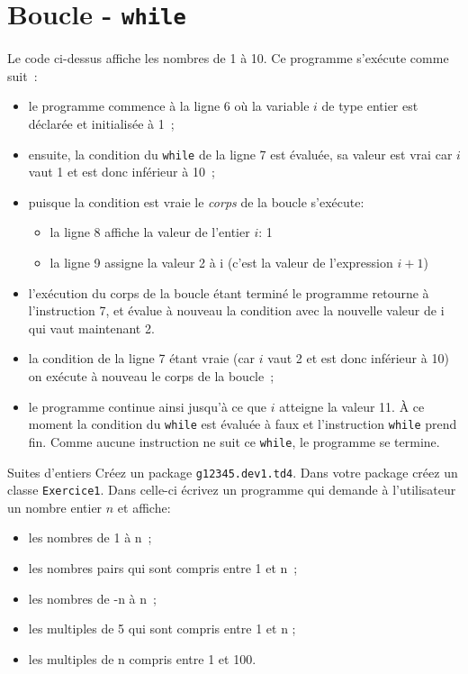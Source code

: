 \documentclass[a4paper,11pt]{style-esi/td}
\begin{document}

\section{Boucle - \texttt{while}}

	Le code ci-dessus affiche les nombres de 1 à 10.
	Ce programme s'exécute comme suit~:
	\begin{itemize}
		\item  le programme commence à la ligne 6 où la variable $i$ de type entier est déclarée et initialisée à 1~;
		\item  ensuite, la condition du \texttt{while} de la ligne 7 est évaluée, sa valeur est vrai car $i$ vaut 1 et est donc inférieur à 10~;
		\item puisque la condition est vraie le \emph{corps} de la boucle s'exécute:
			\begin{itemize}
				\item la ligne 8 affiche la valeur de l'entier $i$: 1
				\item la ligne 9 assigne la valeur 2 à i (c'est la valeur de l'expression $i+1$)
			\end{itemize}
		\item l'exécution du corps de la boucle étant terminé le programme retourne à l'instruction 7, 
			et évalue à nouveau la condition avec la nouvelle valeur de i qui vaut maintenant 2.
		\item  la condition de la ligne 7 étant vraie (car $i$ vaut 2 et est donc inférieur à 10) on exécute à nouveau le corps de la boucle~;
		\item le programme continue ainsi jusqu'à ce que $i$ atteigne la valeur 11. 
			\`A ce moment la condition du \texttt{while} est évaluée à faux et l'instruction 
			\texttt{while} prend fin.
			Comme aucune instruction ne suit ce \texttt{while}, le programme se termine.
	\end{itemize}

 
	\begin{Exercice}{Suites d'entiers}	
		Créez un package \texttt{g12345.dev1.td4}.
		Dans votre package créez un classe \texttt{Exercice1}.
		Dans celle-ci écrivez un programme qui demande à l'utilisateur un nombre entier $n$ et affiche:
		\begin{itemize}
			\item les nombres de 1 à n~;
			\item les nombres pairs qui sont compris entre 1 et n~;
			\item les nombres de -n à n~;
			\item les multiples de 5 qui sont compris entre 1 et n ;
			\item les multiples de n compris entre 1 et 100.
		\end{itemize}
	\end{Exercice}
\end{document}
